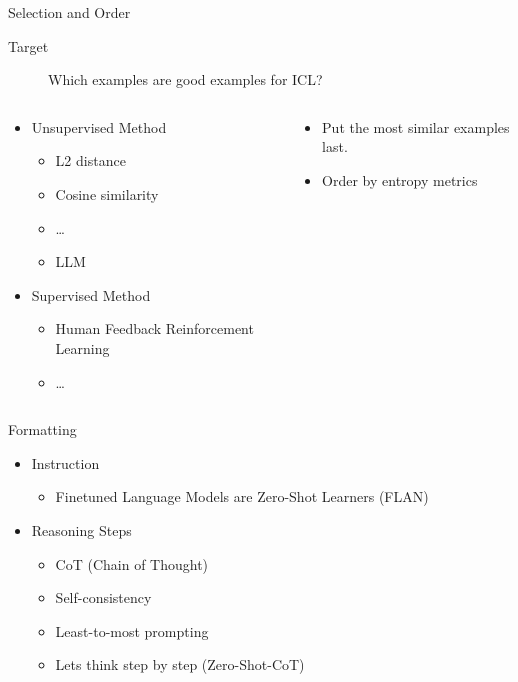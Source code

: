 \documentclass[aspectratio=1610,xcolor={dvipsnames},hyperref={colorlinks,unicode,linkcolor=violet,anchorcolor=BlueViolet,citecolor=YellowOrange,filecolor=black,urlcolor=Aquamarine}]{beamer}
\begin{document}
\begin{frame}[label={sec:orga214039}]{Selection and Order}
\begin{description}
\item[{Target}] Which examples are good examples for ICL?
\end{description}

\begin{columns}
\begin{column}{0.4\columnwidth}
\begin{itemize}
\item Unsupervised Method
\begin{itemize}
\item L2 distance
\item Cosine similarity
\item \ldots{}
\item LLM
\end{itemize}
\item Supervised Method
\begin{itemize}
\item Human Feedback Reinforcement Learning
\item \ldots{}
\end{itemize}
\end{itemize}
\end{column}

\begin{column}{0.4\columnwidth}
\begin{itemize}
\item Put the most similar examples last.
\item Order by entropy metrics 
\end{itemize}
\end{column}
\end{columns}
\end{frame}

\begin{frame}[label={sec:org9c243b3}]{Formatting}
\begin{itemize}
\item Instruction
\begin{itemize}
\item Finetuned Language Models are Zero-Shot Learners (FLAN) 
\end{itemize}
\item Reasoning Steps
\begin{itemize}
\item CoT (Chain of Thought) 
\item Self-consistency 
\item Least-to-most prompting 
\item Lets think step by step (Zero-Shot-CoT) 
\end{itemize}
\end{itemize}
\end{frame}
\end{document}
